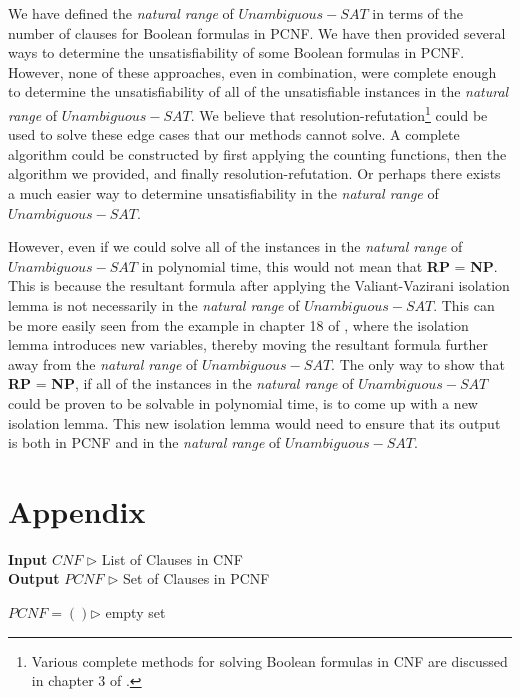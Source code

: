 \documentclass[runningheads,a4paper]{llncs}
\let\oldsim\sim
\renewcommand{\sim}{{\oldsim}}
\begin{document}
We have defined the \emph{natural range} of ${Unambiguous-SAT}$ in terms of the number of clauses for Boolean formulas in PCNF. We have then provided several ways to determine the unsatisfiability of some Boolean formulas in PCNF. However, none of these approaches, even in combination, were complete enough to determine the unsatisfiability of all of the unsatisfiable instances in the \emph{natural range} of ${Unambiguous-SAT}$. We believe that resolution-refutation\footnote{Various complete methods for solving Boolean formulas in CNF are discussed in chapter 3 of  \cite{AMH09}.} could be used to solve these edge cases that our methods cannot solve. A complete algorithm could be constructed by first applying the counting functions, then the algorithm we provided, and finally resolution-refutation. Or perhaps there exists a much easier way to determine unsatisfiability in the \emph{natural range} of ${Unambiguous-SAT}$.

However, even if we could solve all of the instances in the \emph{natural range} of ${Unambiguous-SAT}$ in polynomial time, this would not mean that {\bf RP} = {\bf NP}. This is because the resultant formula after applying the Valiant-Vazirani isolation lemma is not necessarily in the  \emph{natural range} of ${Unambiguous-SAT}$. This can be more easily seen from the example in chapter 18 of \cite{P94}, where the isolation lemma introduces new variables, thereby moving the resultant formula further away from the \emph{natural range} of ${Unambiguous-SAT}$. The only way to show that {\bf RP} = {\bf NP}, if all of the instances in the \emph{natural range} of ${Unambiguous-SAT}$ could be proven to be solvable in polynomial time, is to come up with a new isolation lemma. This new isolation lemma would need to ensure that its output is both in PCNF and in the \emph{natural range} of ${Unambiguous-SAT}$. 


\newpage
\section{Appendix}
\begin{algorithm}[H]
\caption{An algorithm that turns a CNF to PCNF}
 \hspace*{\algorithmicindent} \textbf{Input} $CNF$ {$\triangleright$ List of Clauses in CNF} \\
 \hspace*{\algorithmicindent} \textbf{Output} $PCNF$ {$\triangleright$ Set of Clauses in PCNF}
\begin{algorithmic}
\State $PCNF=()${$\triangleright$ empty set }
          \State{$temp\_c.add(re.sub('\sim','',l))$}
      \EndFor
      \EndIf
\EndFor
\end{algorithmic}
\end{algorithm}
\end{document}
